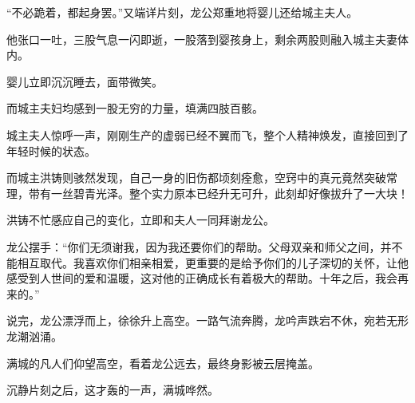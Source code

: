 \begin{this_body}
“不必跪着，都起身罢。”又端详片刻，龙公郑重地将婴儿还给城主夫人。

他张口一吐，三股气息一闪即逝，一股落到婴孩身上，剩余两股则融入城主夫妻体内。

婴儿立即沉沉睡去，面带微笑。

而城主夫妇均感到一股无穷的力量，填满四肢百骸。

城主夫人惊呼一声，刚刚生产的虚弱已经不翼而飞，整个人精神焕发，直接回到了年轻时候的状态。

而城主洪铸则骇然发现，自己一身的旧伤都顷刻痊愈，空窍中的真元竟然突破常理，带有一丝碧青光泽。整个实力原本已经升无可升，此刻却好像拔升了一大块！

洪铸不忙感应自己的变化，立即和夫人一同拜谢龙公。

龙公摆手：“你们无须谢我，因为我还要你们的帮助。父母双亲和师父之间，并不能相互取代。我喜欢你们相亲相爱，更重要的是给予你们的儿子深切的关怀，让他感受到人世间的爱和温暖，这对他的正确成长有着极大的帮助。十年之后，我会再来的。”

说完，龙公漂浮而上，徐徐升上高空。一路气流奔腾，龙吟声跌宕不休，宛若无形龙潮汹涌。

满城的凡人们仰望高空，看着龙公远去，最终身影被云层掩盖。

沉静片刻之后，这才轰的一声，满城哗然。

\end{this_body}

